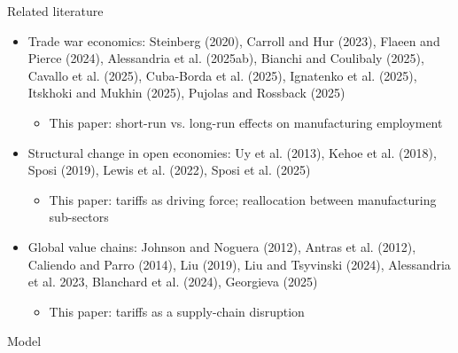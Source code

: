 \documentclass[aspectratio=169,t,10pt,table]{beamer}
\begin{document}
\begin{frame}{Related literature}

\begin{itemize}\addtolength{\itemsep}{1ex}
\item Trade war economics:  {\small{Steinberg (2020), Carroll and Hur (2023), Flaeen and Pierce (2024), Alessandria et al. (2025ab), Bianchi and Coulibaly (2025), Cavallo et al. (2025), Cuba-Borda et al. (2025), Ignatenko et al. (2025), Itskhoki and Mukhin (2025), Pujolas and Rossback (2025)}}
\begin{itemize}
    \item This paper: short-run vs. long-run effects on manufacturing employment
\end{itemize}
    \item Structural change in open economies: {\small{Uy et al. (2013), Kehoe et al. (2018), Sposi (2019), Lewis et al. (2022), Sposi et al. (2025)}}
    \begin{itemize}
    \item This paper: tariffs as driving force; reallocation between manufacturing sub-sectors
\end{itemize}
    \item Global value chains:  {\small{Johnson and Noguera (2012), Antras et al. (2012), Caliendo and Parro (2014), Liu (2019), Liu and Tsyvinski (2024), Alessandria et al. 2023, Blanchard et al. (2024), Georgieva (2025)}}
       \begin{itemize}
    \item This paper: tariffs as a supply-chain disruption
\end{itemize}
\end{itemize}

\end{frame}



\begin{transitionframe}
Model
\end{transitionframe}
\end{document}
